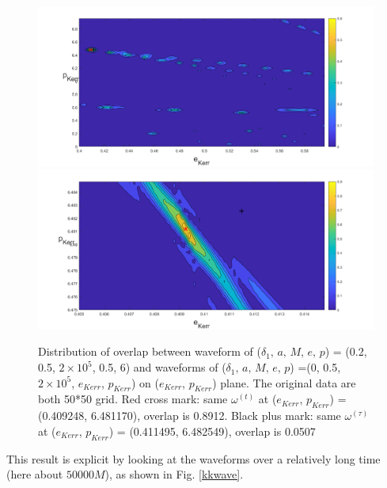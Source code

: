\documentclass{article}
\begin{document}
\begin{figure}[]
	\centering
	\includegraphics[width=16cm]{OLdist.png}
	\includegraphics[width=16cm]{OLdist2.png}
	
	\caption{Distribution of overlap between waveform of ($\delta_1,\, a,\, M,\, e,\, p$) = (0.2, 0.5, $2 \times 10^5 $, 0.5, 6) and waveforms of ($\delta_1,\, a,\, M,\, e,\, p$) =(0, 0.5, $2 \times 10^5 $, $e_{Kerr}$, $p_{Kerr}$) on ($e_{Kerr}$, $p_{Kerr}$) plane. The original data are both 50*50 grid. Red cross mark: same $\omega^{(t)}$ at ($e_{Kerr}$, $p_{Kerr}$) = (0.409248, 6.481170), overlap is 0.8912. Black plus mark: same $\omega^{(\tau)}$ at  ($e_{Kerr}$, $p_{Kerr}$) = (0.411495, 6.482549), overlap is 0.0507 }
	\label{overlapdist}
\end{figure}

This result is explicit by looking at the waveforms over a relatively long time (here about $50000M$), as shown in Fig. \ref{kkwave}. 
\end{document}
